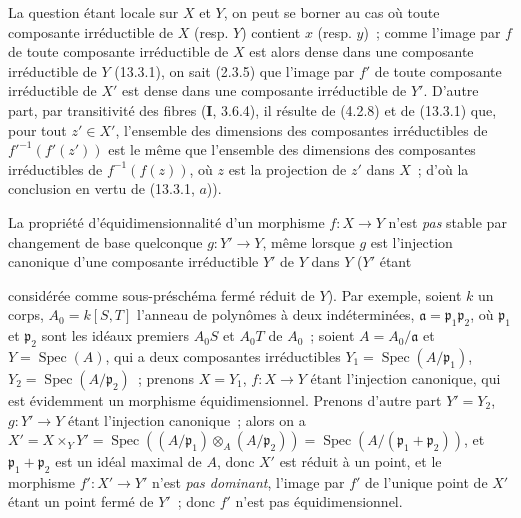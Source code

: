 La question étant locale sur $X$ et $Y$, on peut se borner au cas où toute
composante irréductible de $X$ (resp. $Y$) contient $x$ (resp. $y$)~; comme
l'image par $f$ de toute composante irréductible de $X$ est alors dense dans
une composante irréductible de $Y$ (13.3.1), on sait (2.3.5) que l'image par
$f'$ de toute composante irréductible de $X'$ est dense dans une composante
irréductible de $Y'$. D'autre part, par transitivité des fibres
(\textbf{I}, 3.6.4), il résulte de (4.2.8) et de (13.3.1) que, pour tout
$z'\in X'$, l'ensemble des dimensions des composantes irréductibles de
${f'}^{-1}(f'(z'))$ est le même que l'ensemble des dimensions des composantes
irréductibles de $f^{-1}(f(z))$, où $z$ est la projection de $z'$ dans $X$~;
d'où la conclusion en vertu de (13.3.1, $a$)).

\begin{remark}[13.3.9]
\label{IV.13.3.9-fr}
La propriété d'équidimensionnalité d'un morphisme $f:X\to Y$ n'est \emph{pas}
stable par changement de base quelconque $g:Y'\to Y$, même lorsque $g$ est
l'injection canonique d'une composante irréductible $Y'$ de $Y$ dans $Y$
($Y'$ étant

considérée comme sous-préschéma fermé réduit de $Y$). Par exemple, soient $k$
un corps, $A_0=k[S,T]$ l'anneau de polynômes à deux indéterminées,
$\mathfrak a=\mathfrak p_1\mathfrak p_2$, où $\mathfrak p_1$ et
$\mathfrak p_2$ sont les idéaux premiers $A_0S$ et $A_0T$ de $A_0$~; soient
$A=A_0/\mathfrak a$ et $Y=\operatorname{Spec}(A)$, qui a deux composantes
irréductibles $Y_1=\operatorname{Spec}(A/\mathfrak p_1)$,
$Y_2=\operatorname{Spec}(A/\mathfrak p_2)$~; prenons $X=Y_1$,
$f:X\to Y$ étant l'injection canonique, qui est évidemment un morphisme
équidimensionnel. Prenons d'autre part $Y'=Y_2$, $g:Y'\to Y$ étant l'injection
canonique~; alors on a
$X'=X\times_Y Y'=\operatorname{Spec}((A/\mathfrak p_1)\otimes_A
(A/\mathfrak p_2))=\operatorname{Spec}(A/(\mathfrak p_1+\mathfrak p_2))$,
et $\mathfrak p_1+\mathfrak p_2$ est un idéal maximal de $A$, donc $X'$ est
réduit à un point, et le morphisme $f':X'\to Y'$ n'est \emph{pas dominant},
l'image par $f'$ de l'unique point de $X'$ étant un point fermé de $Y'$~;
donc $f'$ n'est pas équidimensionnel.


\end{remark}
